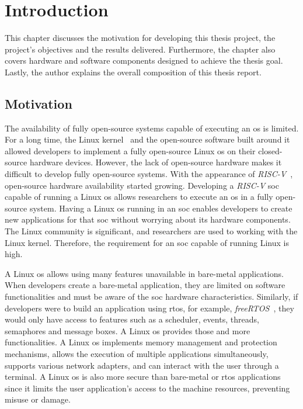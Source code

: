 \chapter{Introduction}
\label{chapter:introduction}
This chapter discusses the motivation for developing this thesis project, the project's objectives and the results delivered. Furthermore, the chapter also covers hardware and software components designed to achieve the thesis goal. Lastly, the author explains the overall composition of this thesis report.

\section{Motivation}
\label{section:motivation}
The availability of fully open-source systems capable of executing an \acrfull{os} is limited. For a long time, the Linux kernel~\cite{torvalds1997linux} and the open-source software built around it allowed developers to implement a fully open-source Linux \acrshort{os} on their closed-source hardware devices. However, the lack of open-source hardware makes it difficult to develop fully open-source systems. With the appearance of \textit{RISC-V}~\cite{asanovic2014instruction}, open-source hardware availability started growing. Developing a \textit{RISC-V} \acrfull{soc} capable of running a Linux \acrshort{os} allows researchers to execute an \acrshort{os} in a fully open-source system. Having a Linux \acrshort{os} running in an \acrshort{soc} enables developers to create new applications for that \acrshort{soc} without worrying about its hardware components. The Linux community is significant, and researchers are used to working with the Linux kernel. Therefore, the requirement for an \acrshort{soc} capable of running Linux is high.

A Linux \acrshort{os} allows using many features unavailable in bare-metal applications. When developers create a bare-metal application, they are limited on software functionalities and must be aware of the \acrshort{soc} hardware characteristics. Similarly, if developers were to build an application using \acrfull{rtos}, for example, \textit{freeRTOS}~\cite{barry2008freertos}, they would only have access to features such as a scheduler, events, threads, semaphores and message boxes. A Linux \acrshort{os} provides those and more functionalities. A Linux \acrshort{os} implements memory management and protection mechanisms, allows the execution of multiple applications simultaneously, supports various network adapters, and can interact with the user through a terminal. A Linux \acrshort{os} is also more secure than bare-metal or \acrshort{rtos} applications since it limits the user application's access to the machine resources, preventing misuse or damage.

